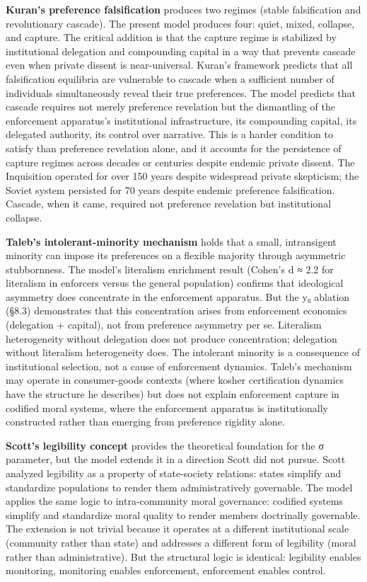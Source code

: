 \documentclass[12pt]{article}
\begin{document}
\textbf{Kuran's preference falsification} produces two regimes (stable falsification and revolutionary cascade). The present model produces four: quiet, mixed, collapse, and capture. The critical addition is that the capture regime is stabilized by institutional delegation and compounding capital in a way that prevents cascade even when private dissent is near-universal. Kuran's framework predicts that all falsification equilibria are vulnerable to cascade when a sufficient number of individuals simultaneously reveal their true preferences. The model predicts that cascade requires not merely preference revelation but the dismantling of the enforcement apparatus's institutional infrastructure, its compounding capital, its delegated authority, its control over narrative. This is a harder condition to satisfy than preference revelation alone, and it accounts for the persistence of capture regimes across decades or centuries despite endemic private dissent. The Inquisition operated for over 150 years despite widespread private skepticism; the Soviet system persisted for 70 years despite endemic preference falsification. Cascade, when it came, required not preference revelation but institutional collapse.

\textbf{Taleb's intolerant-minority mechanism} holds that a small, intransigent minority can impose its preferences on a flexible majority through asymmetric stubbornness. The model's literalism enrichment result (Cohen's d ≈ 2.2 for literalism in enforcers versus the general population) confirms that ideological asymmetry does concentrate in the enforcement apparatus. But the y₀ ablation (§8.3) demonstrates that this concentration arises from enforcement economics (delegation + capital), not from preference asymmetry per se. Literalism heterogeneity without delegation does not produce concentration; delegation without literalism heterogeneity does. The intolerant minority is a consequence of institutional selection, not a cause of enforcement dynamics. Taleb's mechanism may operate in consumer-goods contexts (where kosher certification dynamics have the structure he describes) but does not explain enforcement capture in codified moral systems, where the enforcement apparatus is institutionally constructed rather than emerging from preference rigidity alone.

\textbf{Scott's legibility concept} provides the theoretical foundation for the σ parameter, but the model extends it in a direction Scott did not pursue. Scott analyzed legibility as a property of state-society relations: states simplify and standardize populations to render them administratively governable. The model applies the same logic to intra-community moral governance: codified systems simplify and standardize moral quality to render members doctrinally governable. The extension is not trivial because it operates at a different institutional scale (community rather than state) and addresses a different form of legibility (moral rather than administrative). But the structural logic is identical: legibility enables monitoring, monitoring enables enforcement, enforcement enables control.
\end{document}
